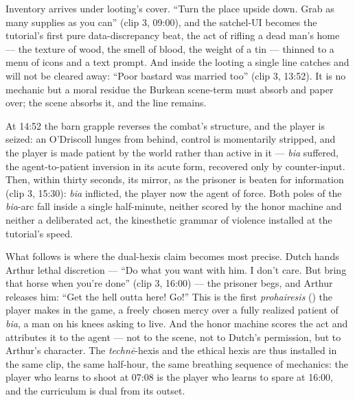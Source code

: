 Inventory arrives under looting's cover. ``Turn the place upside down. Grab as many supplies as you can'' (clip 3, 09:00), and the satchel-UI becomes the tutorial's first pure data-discrepancy beat, the act of rifling a dead man's home — the texture of wood, the smell of blood, the weight of a tin — thinned to a menu of icons and a text prompt. And inside the looting a single line catches and will not be cleared away: ``Poor bastard was married too'' (clip 3, 13:52). It is no mechanic but a moral residue the Burkean scene-term must absorb and paper over; the scene absorbs it, and the line remains.

At 14:52 the barn grapple reverses the combat's structure, and the player is seized: an O'Driscoll lunges from behind, control is momentarily stripped, and the player is made patient by the world rather than active in it — \textit{bia} suffered, the agent-to-patient inversion in its acute form, recovered only by counter-input. Then, within thirty seconds, its mirror, as the prisoner is beaten for information (clip 3, 15:30): \textit{bia} inflicted, the player now the agent of force. Both poles of the \textit{bia}-arc fall inside a single half-minute, neither scored by the honor machine and neither a deliberated act, the kinesthetic grammar of violence installed at the tutorial's speed.

What follows is where the dual-hexis claim becomes most precise. Dutch hands Arthur lethal discretion — ``Do what you want with him. I don't care. But bring that horse when you're done'' (clip 3, 16:00) — the prisoner begs, and Arthur releases him: ``Get the hell outta here! Go!'' This is the first \textit{prohairesis} () the player makes in the game, a freely chosen mercy over a fully realized patient of \textit{bia}, a man on his knees asking to live. And the honor machine scores the act and attributes it to the agent — not to the scene, not to Dutch's permission, but to Arthur's character. The \textit{technē}-hexis and the ethical hexis are thus installed in the same clip, the same half-hour, the same breathing sequence of mechanics: the player who learns to shoot at 07:08 is the player who learns to spare at 16:00, and the curriculum is dual from its outset.

